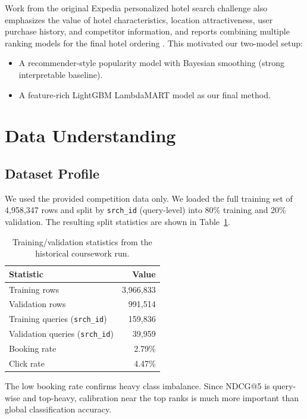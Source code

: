 \documentclass{llncs}
\begin{document}
Work from the original Expedia personalized hotel search challenge also emphasizes the value of hotel characteristics, location attractiveness, user purchase history, and competitor information, and reports combining multiple ranking models for the final hotel ordering \cite{liu2013expedia}. This motivated our two-model setup:
\begin{itemize}
\item A recommender-style popularity model with Bayesian smoothing (strong interpretable baseline).
\item A feature-rich LightGBM LambdaMART model as our final method.
\end{itemize}

\section{Data Understanding}
\label{sec:data}

\subsection{Dataset Profile}
We used the provided competition data only. We loaded the full training set of 4{,}958{,}347 rows and split by \texttt{srch\_id} (query-level) into 80\% training and 20\% validation. The resulting split statistics are shown in Table~\ref{tab:splitstats}.

\begin{table}[t]
\centering
\caption{Training/validation statistics from the historical coursework run.}
\label{tab:splitstats}
\begin{tabular}{lr}
\toprule
Statistic & Value \\
\midrule
Training rows & 3{,}966{,}833 \\
Validation rows & 991{,}514 \\
Training queries (\texttt{srch\_id}) & 159{,}836 \\
Validation queries (\texttt{srch\_id}) & 39{,}959 \\
Booking rate & 2.79\% \\
Click rate & 4.47\% \\
\bottomrule
\end{tabular}
\end{table}

The low booking rate confirms heavy class imbalance. Since NDCG@5 is query-wise and top-heavy, calibration near the top ranks is much more important than global classification accuracy.
\end{document}
